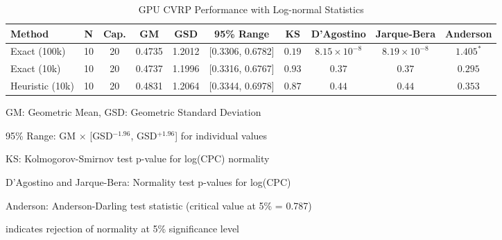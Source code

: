 \begin{table*}[htbp]
\centering
\caption{GPU CVRP Performance with Log-normal Statistics}
\label{tab:gpu-lognormal}
\begin{tabular}{@{}l c c S[table-format=1.4] S[table-format=1.4] c c c c c@{}}
\toprule
\textbf{Method} & \textbf{N} & \textbf{Cap.} & {\textbf{GM}} & {\textbf{GSD}} & \textbf{95\% Range} & \textbf{KS} & \textbf{D'Agostino} & \textbf{Jarque-Bera} & \textbf{Anderson} \\
\midrule
Exact (100k) & 10 & 20 & 0.4735 & 1.2012 & [0.3306, 0.6782] & $0.19$ & $8.15 \times 10^{-8}$ & $8.19 \times 10^{-8}$ & $1.405^*$ \\
Exact (10k) & 10 & 20 & 0.4737 & 1.1996 & [0.3316, 0.6767] & $0.93$ & $0.37$ & $0.37$ & $0.295$ \\
Heuristic (10k) & 10 & 20 & 0.4831 & 1.2064 & [0.3344, 0.6978] & $0.87$ & $0.44$ & $0.44$ & $0.353$ \\
\bottomrule
\end{tabular}
\begin{tablenotes}
\small
\item GM: Geometric Mean, GSD: Geometric Standard Deviation
\item 95\% Range: GM $\times$ [GSD$^{-1.96}$, GSD$^{+1.96}$] for individual values
\item KS: Kolmogorov-Smirnov test p-value for log(CPC) normality
\item D'Agostino and Jarque-Bera: Normality test p-values for log(CPC)
\item Anderson: Anderson-Darling test statistic (critical value at 5\% = 0.787)
\item * indicates rejection of normality at 5\% significance level
\end{tablenotes}
\end{table*}
